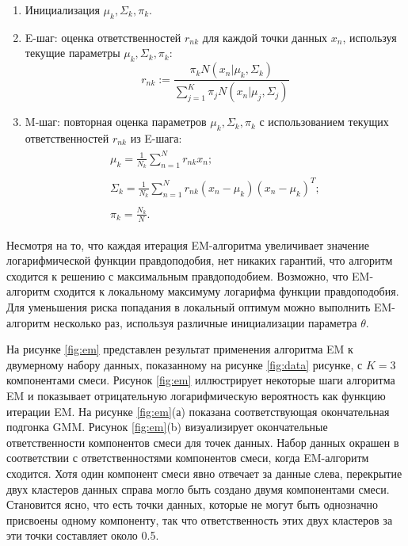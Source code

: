 \begin{enumerate}[label*=\arabic*.]
	\item Инициализация $\mu_k, \Sigma_k, \pi_k$.
	\item E-шаг: оценка ответственностей $r_{nk}$ для каждой точки данных $x_n$, используя
	текущие параметры $\mu_k, \Sigma_k, \pi_k$:
	\begin{equation}
		r_{nk} := \frac{\pi_k N(x_n \vert \mu_k, \Sigma_k)}{\sum_{j=1}^{K}\pi_j N(x_n \vert \mu_j, \Sigma_j)}
	\end{equation}
	\item M-шаг: повторная оценка параметров $\mu_k, \Sigma_k, \pi_k$ с использованием текущих ответственностей $r_{nk}$ из E-шага:
	\begin{align}
		\begin{split}\label{eq:1}
			\mu_k = \frac{1}{N_k}\sum_{n=1}^{N}r_{nk}x_n;
		\end{split}\\
		\begin{split}\label{eq:2}
			\Sigma_k = \frac{1}{N_k}\sum_{n=1}^{N}r_{nk}(x_n - \mu_k)(x_n - \mu_k)^T;
		\end{split}\\
		\begin{split}\label{eq:3}
			\pi_k = \frac{N_k}{N}.
		\end{split}
	\end{align}
\end{enumerate}

Несмотря на то, что каждая итерация EM-алгоритма увеличивает значение логарифмической функции правдоподобия, нет никаких гарантий, что алгоритм сходится к решению с максимальным правдоподобием. Возможно, что EM-алгоритм сходится к локальному максимуму логарифма функции правдоподобия. Для уменьшения риска попадания в локальный оптимум можно выполнить EM-алгоритм несколько раз, используя различные инициализации параметра $\theta$.~\cite{bishop, rogers}

На рисунке \ref{fig:em} представлен результат применения алгоритма EM к двумерному набору данных, показанному на рисунке \ref{fig:data} рисунке, с $K = 3$ компонентами смеси. Рисунок \ref{fig:em} иллюстрирует некоторые шаги алгоритма EM и показывает отрицательную логарифмическую вероятность как функцию итерации EM. На рисунке \ref{fig:em}(а) показана соответствующая окончательная подгонка GMM. Рисунок  \ref{fig:em}(b) визуализирует окончательные ответственности компонентов смеси для точек данных. Набор данных окрашен в соответствии с ответственностями компонентов смеси, когда
EM-алгоритм сходится. Хотя один компонент смеси явно отвечает за данные слева, перекрытие двух кластеров данных справа могло быть создано двумя компонентами смеси. Становится ясно, что есть точки данных, которые не могут быть однозначно присвоены одному компоненту, так что ответственность этих двух кластеров за эти точки составляет около 0.5.~\cite{math}

